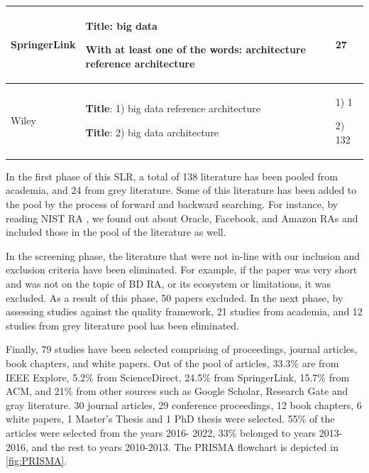 \documentclass{bmcart}
\begin{document}
\begin{table}
\begin{tabular}{|p{2.8cm}|p{7cm}|p{1.5cm}|}
      \\ 
      \hline

      SpringerLink & \textbf{Title}: big data


      \textbf{With at least one of the words}: architecture reference architecture

       & 27 \\ 
      \hline

      Wiley & 
      \textbf{Title}: 1) big data reference architecture  
      
      \textbf{Title}: 2) big data architecture
      & 
      1) 1


      2) 132
      
      \\ 

      \hline
  \end{tabular}
  
  \label{searchTermsSecond}
\end{table}

In the first phase of this SLR, a total of 138 literature has been pooled from academia, and 24 from grey literature. Some of this literature has been added to the pool by the process of forward and backward searching. For instance, by reading NIST RA \cite{Chang.2019}, we found out about Oracle, Facebook, and Amazon RAs and included those in the pool of the literature as well. 

In the screening phase, the literature that were not in-line with our inclusion and exclusion criteria have been eliminated. For example, if the paper was very short and was not on the topic of BD RA, or its ecosystem or limitations, it was excluded. As a result of this phase, 50 papers excluded. In the next phase, by assessing studies against the quality framework, 21 studies from academia, and 12 studies from grey literature pool has been eliminated.

Finally, 79 studies have been selected comprising of proceedings, journal articles, book chapters, and white papers. Out of the pool of articles, 33.3\% are from IEEE Explore, 5.2\% from ScienceDirect, 24.5\% from SpringerLink, 15.7\% from ACM, and 21\% from other sources such as Google Scholar, Research Gate and gray literature. 30 journal articles, 29 conference proceedings, 12 book chapters, 6 white papers, 1 Master’s Thesis and 1 PhD thesis were selected. 55\% of the articles were selected from the years 2016- 2022, 33\% belonged to years 2013-2016, and the rest to years 2010-2013. The PRISMA flowchart is depicted in \ref{fig:PRISMA}.
\end{document}
